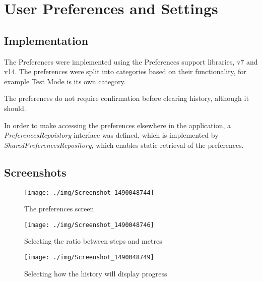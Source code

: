 \documentclass[report.tex]{subfiles}
\begin{document}
\section{User Preferences and Settings} %
\label{sec:user_preferences_and_settings}
\subsection{Implementation} %
\label{sub:implementation_7}
The Preferences were implemented using the Preferences support libraries, v7 and
v14. The preferences were split into categories based on their functionality,
for example Test Mode is its own category.

The preferences do not require confirmation before clearing history, although it
should.

In order to make accessing the preferences elsewhere in the application, a
\emph{PreferencesRepoistory} interface was defined, which is implemented by
\emph{SharedPreferencesRepository}, which enables static retrieval of the
preferences.

\subsection{Screenshots} %
\label{sub:screenshots_7}
\begin{figure}[H]
    \centering
    \texttt{[image: ./img/Screenshot\_1490048744]}
    \caption{The preferences screen}
\end{figure}

\begin{figure}[H]
    \centering
    \texttt{[image: ./img/Screenshot\_1490048746]}
    \caption{Selecting the ratio between steps and metres}
\end{figure}


\begin{figure}[H]
    \centering
    \texttt{[image: ./img/Screenshot\_1490048749]}
    \caption{Selecting how the history will display progress}
\end{figure}

\newpage
\end{document}
